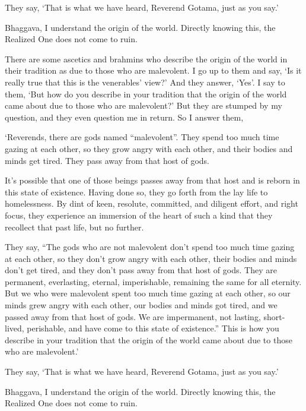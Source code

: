 \documentclass[12pt,openany]{book}%
\begin{document}
They say, ‘That is what we have heard, Reverend Gotama, just as you say.’ 

Bhaggava, I understand the origin of the world. Directly knowing this, the Realized One does not come to ruin. 

There are some ascetics and brahmins who describe the origin of the world in their tradition as due to those who are malevolent. I go up to them and say, ‘Is it really true that this is the venerables’ view?’ And they answer, ‘Yes’. I say to them, ‘But how do you describe in your tradition that the origin of the world came about due to those who are malevolent?’ But they are stumped by my question, and they even question me in return. So I answer them, 

‘Reverends, there are gods named “malevolent”. They spend too much time gazing at each other, so they grow angry with each other, and their bodies and minds get tired. They pass away from that host of gods. 

It’s possible that one of those beings passes away from that host and is reborn in this state of existence. Having done so, they go forth from the lay life to homelessness. By dint of keen, resolute, committed, and diligent effort, and right focus, they experience an immersion of the heart of such a kind that they recollect that past life, but no further. 

They say, “The gods who are not malevolent don’t spend too much time gazing at each other, so they don’t grow angry with each other, their bodies and minds don’t get tired, and they don’t pass away from that host of gods. They are permanent, everlasting, eternal, imperishable, remaining the same for all eternity. But we who were malevolent spent too much time gazing at each other, so our minds grew angry with each other, our bodies and minds got tired, and we passed away from that host of gods. We are impermanent, not lasting, short-lived, perishable, and have come to this state of existence.” This is how you describe in your tradition that the origin of the world came about due to those who are malevolent.’ 

They say, ‘That is what we have heard, Reverend Gotama, just as you say.’ 

Bhaggava, I understand the origin of the world. Directly knowing this, the Realized One does not come to ruin. 
\end{document}
